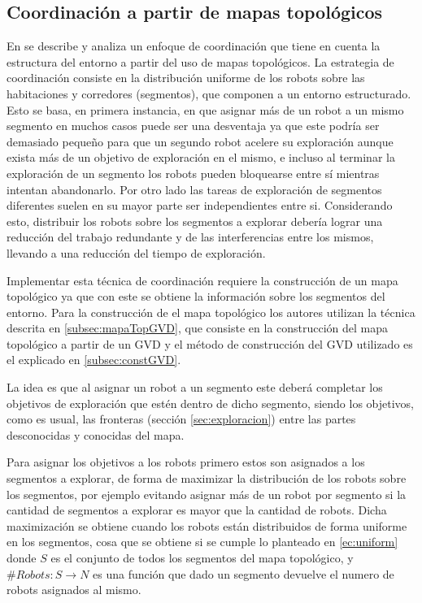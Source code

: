 \subsection{Coordinación a partir de mapas topológicos}

En \cite{wurm2008coordinated} se describe y analiza un enfoque de coordinación que tiene en cuenta la estructura del entorno a partir del uso de mapas topológicos. La estrategia de coordinación consiste en la distribución uniforme de los robots sobre las habitaciones y corredores (segmentos), que componen a un entorno estructurado. Esto se basa, en primera instancia, en que asignar más de un robot a un mismo segmento en muchos casos puede ser una desventaja ya que este podría ser demasiado pequeño para que un segundo robot acelere su exploración aunque exista más de un objetivo de exploración en el mismo, e incluso al terminar la exploración de un segmento los robots pueden bloquearse entre sí mientras intentan abandonarlo. Por otro lado las tareas de exploración de segmentos diferentes suelen en su mayor parte ser independientes entre si. Considerando esto, distribuir los robots sobre los segmentos a explorar debería lograr una reducción del trabajo redundante y de las interferencias entre los mismos, llevando a una reducción del tiempo de exploración.

Implementar esta técnica de coordinación requiere la construcción de un mapa topológico ya que con este se obtiene la información sobre los segmentos del entorno. Para la construcción de el mapa topológico los autores utilizan la técnica descrita en \ref{subsec:mapaTopGVD}, que consiste en la construcción del mapa topológico a partir de un GVD y el método de construcción del GVD utilizado es el explicado en \ref{subsec:constGVD}.

La idea es que al asignar un robot a un segmento este deberá completar los objetivos de exploración que estén dentro de dicho segmento, siendo los objetivos, como es usual, las fronteras (sección \ref{sec:exploracion}) entre las partes desconocidas y conocidas del mapa. 

Para asignar los objetivos a los robots primero estos son asignados a los segmentos a explorar, de forma de maximizar la distribución de los robots sobre los segmentos, por ejemplo evitando asignar más de un robot por segmento si la cantidad de segmentos a explorar es mayor que la cantidad de robots. Dicha maximización se obtiene cuando los robots están distribuidos de forma uniforme en los segmentos, cosa que se obtiene si se cumple lo planteado en \eqref{ec:uniform} donde $S$ es el conjunto de todos los segmentos del mapa topológico, y $\#Robots : S \rightarrow N$ es una función que dado un segmento devuelve el numero de robots asignados al mismo. 

